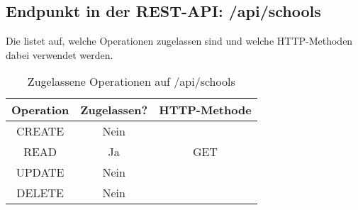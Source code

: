 \subsection{Endpunkt in der REST-API: /api/schools}
\label{sec:end:rest:api:school}
Die  listet auf, welche Operationen zugelassen sind und welche HTTP-Methoden dabei verwendet werden. 


\begin{table}[!htbp]
	\begin{tabular}{|c|c|c|}
		\hline
			\textbf{Operation} & \textbf{Zugelassen?} & \textbf{HTTP-Methode} \\ \hline
			CREATE & Nein & \\ \hline 
			READ & Ja & GET \\ \hline
			UPDATE & Nein & \\ \hline 
			DELETE & Nein & \\ \hline
	\end{tabular}

		\caption{Zugelassene Operationen auf /api/schools}
		\label{tab:end:rest:api:schools:meth}
\end{table}